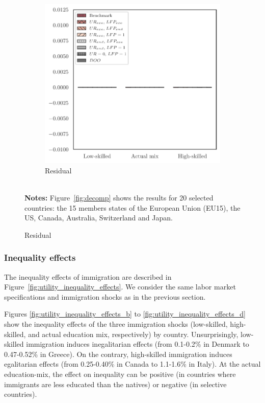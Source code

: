 \documentclass[a4paper,12pt]{article}
\begin{document}
\begin{landscape}
\begin{center}
\begin{figure}[htb!]
\begin{subfigure}{.3\linewidth}
\end{subfigure}
\hfill
\begin{subfigure}{.3\linewidth}
  \centering
\caption{Residual} \label{fig:decomp_mean_Resn}
  \includegraphics[width=\linewidth]{graphs/qResn.pdf}
\end{subfigure}
\\[0.5cm]
{\footnotesize \textbf{Notes:} Figure~\ref{fig:decomp} shows the results for 20 selected countries:
the 15 members states of the European Union (EU15), the US, Canada,
Australia, Switzerland and Japan.}
\end{figure}
\end{center}
\end{landscape}
\restoregeometry

\subsubsection{Inequality effects}

The inequality effects of immigration are described in Figure~\ref{fig:utility_inequality_effects}. We consider the same labor market specifications and immigration shocks as in the previous section.

Figures \ref{fig:utility_inequality_effects_b} to \ref{fig:utility_inequality_effects_d} show the inequality effects of the three immigration shocks (low-skilled, high-skilled, and actual education mix, respectively) by country. Unsurprisingly, low-skilled immigration induces inegalitarian effects (from 0.1-0.2\% in Denmark to 0.47-0.52\% in Greece). On the contrary, high-skilled immigration induces egalitarian effects (from 0.25-0.40\% in Canada to 1.1-1.6\% in Italy). At the actual education-mix, the effect on inequality can be positive (in countries where immigrants are less educated than the natives) or negative (in selective countries).
\end{document}
